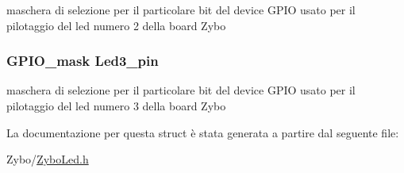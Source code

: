 maschera di selezione per il particolare bit del device G\+P\+I\+O usato per il pilotaggio del led numero 2 della board Zybo \hypertarget{struct_zybo_led__t_a85b108a2f134972366da967a9489068f}{
\subsubsection[{Led3\+\_\+pin}]{\setlength{\rightskip}{0pt plus 5cm}G\+P\+I\+O\+\_\+mask Led3\+\_\+pin}}\label{struct_zybo_led__t_a85b108a2f134972366da967a9489068f}
maschera di selezione per il particolare bit del device G\+P\+I\+O usato per il pilotaggio del led numero 3 della board Zybo 

La documentazione per questa struct è stata generata a partire dal seguente file\+:\begin{DoxyCompactItemize}
\item 
Zybo/\hyperlink{_zybo_led_8h}{Zybo\+Led.\+h}\end{DoxyCompactItemize}
